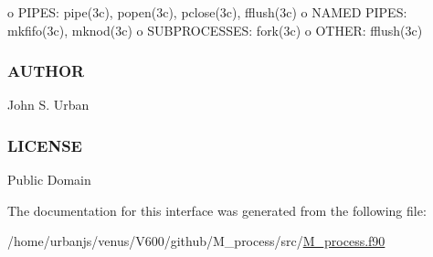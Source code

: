 o P\+I\+P\+ES\+: pipe(3c), popen(3c), pclose(3c), fflush(3c) o N\+A\+M\+ED P\+I\+P\+ES\+: mkfifo(3c), mknod(3c) o S\+U\+B\+P\+R\+O\+C\+E\+S\+S\+ES\+: fork(3c) o O\+T\+H\+ER\+: fflush(3c) \subsubsection*{A\+U\+T\+H\+OR}

John S. Urban \subsubsection*{L\+I\+C\+E\+N\+SE}

Public Domain 

The documentation for this interface was generated from the following file\+:\begin{DoxyCompactItemize}
\item 
/home/urbanjs/venus/\+V600/github/\+M\+\_\+process/src/\mbox{\hyperlink{M__process_8f90}{M\+\_\+process.\+f90}}\end{DoxyCompactItemize}
